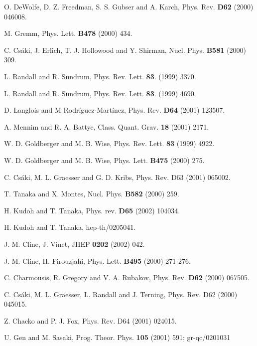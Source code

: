 \documentclass[a4paper,11pt]{article}
\begin{document}
\begin{thebibliography}{99}
 O. DeWolfe, D. Z. Freedman, S. S. Gubser and A. Karch, 
Phys. Rev. {\bf D62} (2000) 046008. 

 M. Gremm, Phys. Lett. {\bf B478} (2000) 434. 

 C. Cs\'{a}ki, J. Erlich, T. J. Hollowood and Y. Shirman, 
Nucl. Phys. {\bf B581} (2000) 309. 

 L. Randall and R. Sundrum, Phys. Rev. Lett. {\bf 83}. 
(1999) 3370. 

 L. Randall and R. Sundrum, Phys. Rev. Lett. {\bf 83}.
(1999) 4690.


 D. Langlois and M Rodr\'{i}guez-Mart\'{i}nez, 
Phys. Rev. {\bf D64} (2001) 123507. 

 A. Mennim and R. A. Battye, 
Class. Quant. Grav. {\bf 18} (2001) 2171. 

 W. D. Goldberger and M. B. Wise, 
Phys. Rev. Lett. {\bf 83} (1999) 4922.

 W. D. Goldberger and M. B. Wise, 
 Phys. Lett. {\bf B475} (2000) 275. 


 C. Cs\'{a}ki, M. L. Graesser and G. D. Kribs, 
Phys. Rev. {D63} (2001) 065002. 

 T. Tanaka and X. Montes, 
Nucl. Phys. {\bf B582} (2000) 259. 

 H. Kudoh and T. Tanaka, 
Phys. rev. {\bf D65} (2002) 104034. 

 H. Kudoh and T. Tanaka, hep-th/0205041.

 J. M. Cline, J. Vinet, 
JHEP {\bf 0202} (2002) 042. 

 J. M. Cline, H. Firouzjahi, 
Phys. Lett.  {\bf B495} (2000) 271-276. 

 C. Charmousis, R. Gregory and V. A. Rubakov,  
Phys. Rev. {\bf D62} (2000) 067505. 

 C. Cs\'{a}ki, M. L. Graesser, L. Randall and J. Terning, 
Phys. Rev. {D62} (2000) 045015. 

 Z. Chacko and P. J. Fox, 
Phys. Rev. {D64} (2001) 024015. 

 U. Gen and M. Sasaki, 
Prog. Theor. Phys. {\bf 105} (2001) 591; gr-qc/0201031


\end{thebibliography}
\end{document}
